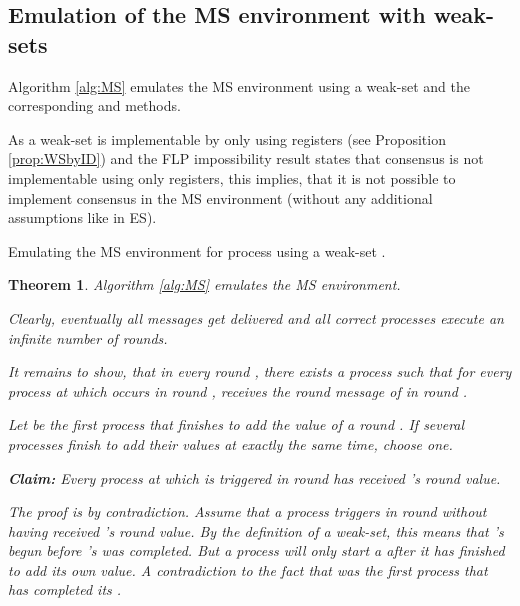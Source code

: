 \documentclass[conference, compsoc]{IEEEtran}
\newtheorem{theorem}{Theorem}
\begin{document}
\subsection{Emulation of the MS environment with weak-sets} 

Algorithm \ref{alg:MS} emulates the MS environment using a weak-set  and the corresponding  and  methods.

As a weak-set is implementable by only using registers (see Proposition \ref{prop:WSbyID}) and the FLP impossibility result \cite{214121} states that consensus is not implementable using only registers, this implies, that it is not possible to implement consensus in the MS environment (without any additional assumptions like in ES).

\begin{algorithm}[htb] 
{\small       
{}
\SetVline
       
\BlankLine


\On{}{
	\;
	\ForAll{}{
		\;
		\Trigger{}\;
	}	
	\Trigger{}\;
}

\caption{Emulating the MS environment for process  using a weak-set .} 
\label{alg:MS}
}
\end{algorithm} 


\begin{theorem}
 Algorithm \ref{alg:MS} emulates the MS environment. 
 \begin{IEEEproof}
 Clearly, eventually all messages get delivered and all correct processes execute an infinite number of rounds.
 
It remains to show, that in every round , there exists a process  such that for every process  at which  occurs in round ,  receives the round  message of  in round .

Let  be the first process that finishes to add the value of a round . If several processes finish to add their values at exactly the same time, choose one. 

\textbf{Claim:} Every process at which  is triggered in round  has  received 's round  value.

The proof is by contradiction. Assume that a process  triggers  in round  without having received 's round  value. By the definition of a weak-set, this means that 's  begun before 's  was completed. But a process will only start a  after it has finished to add its own value. A contradiction to the fact that  was the first process that has completed its .   
 \end{IEEEproof}
\end{theorem}
\end{document}
